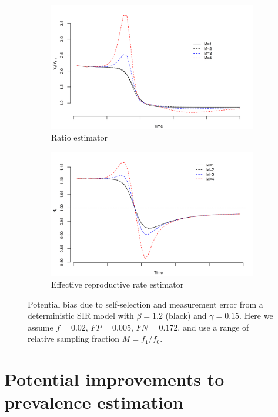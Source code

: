 \documentclass[12pt]{amsart}
\numberwithin{equation}{section}
\theoremstyle{plain}
\begin{document}
\begin{figure}
\centering
\begin{subfigure}{.5\textwidth}
  \centering
  \includegraphics[width=.9\linewidth]{../methods/figs/sir_ratio.png}
  \caption{Ratio estimator}
  \label{fig:ratio-bias}
\end{subfigure}%
\begin{subfigure}{.5\textwidth}
  \centering
  \includegraphics[width=.9\linewidth]{../methods/figs/sir_rt.png}
  \caption{Effective reproductive rate estimator}
  \label{fig:r0-bias}
\end{subfigure}
\caption{Potential bias due to self-selection and measurement error from a deterministic SIR model with $\beta = 1.2$ (black) and $\gamma = 0.15$.  Here we assume $f = 0.02$, $FP = 0.005$, $FN = 0.172$, and use a range of relative sampling fraction $M = f_1/f_0$.}
\label{fig:rates}
\end{figure}

\section{Potential improvements to prevalence estimation}
\label{section:improvedcasecount}
\end{document}
